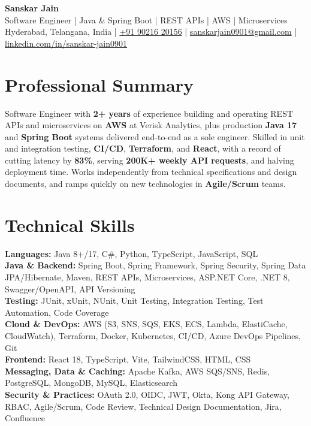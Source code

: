 \documentclass[a4paper,10pt]{article}
\begin{document}
\begin{center}
    {\LARGE \textbf{Sanskar Jain}} \\
    \vspace{2pt}
    Software Engineer \;|\; Java \& Spring Boot \;|\; REST APIs \;|\; AWS \;|\; Microservices \\
    \vspace{2pt}
    Hyderabad, Telangana, India \;|\;
    \href{tel:+919021620156}{+91 90216 20156} \;|\;
    \href{mailto:sanskarjain0901@gmail.com}{sanskarjain0901@gmail.com} \;|\;
    \href{https://www.linkedin.com/in/sanskar-jain0901/}{linkedin.com/in/sanskar-jain0901}
\end{center}

\section*{Professional Summary}
Software Engineer with \textbf{2+ years} of experience building and operating REST APIs and microservices on \textbf{AWS} at Verisk Analytics, plus production \textbf{Java 17} and \textbf{Spring Boot} systems delivered end-to-end as a sole engineer.
Skilled in unit and integration testing, \textbf{CI/CD}, \textbf{Terraform}, and \textbf{React}, with a record of cutting latency by \textbf{83\%}, serving \textbf{200K+ weekly API requests}, and halving deployment time.
Works independently from technical specifications and design documents, and ramps quickly on new technologies in \textbf{Agile/Scrum} teams.

\section*{Technical Skills}
\begin{sloppypar}
\noindent
\textbf{Languages:} Java 8+/17, C\#, Python, TypeScript, JavaScript, SQL \\
\textbf{Java \& Backend:} Spring Boot, Spring Framework, Spring Security, Spring Data JPA/Hibernate, Maven, REST APIs, Microservices, ASP.NET Core, .NET 8, Swagger/OpenAPI, API Versioning \\
\textbf{Testing:} JUnit, xUnit, NUnit, Unit Testing, Integration Testing, Test Automation, Code Coverage \\
\textbf{Cloud \& DevOps:} AWS (S3, SNS, SQS, EKS, ECS, Lambda, ElastiCache, CloudWatch), Terraform, Docker, Kubernetes, CI/CD, Azure DevOps Pipelines, Git \\
\textbf{Frontend:} React 18, TypeScript, Vite, TailwindCSS, HTML, CSS \\
\textbf{Messaging, Data \& Caching:} Apache Kafka, AWS SQS/SNS, Redis, PostgreSQL, MongoDB, MySQL, Elasticsearch \\
\textbf{Security \& Practices:} OAuth 2.0, OIDC, JWT, Okta, Kong API Gateway, RBAC, Agile/Scrum, Code Review, Technical Design Documentation, Jira, Confluence
\end{sloppypar}
\end{document}
